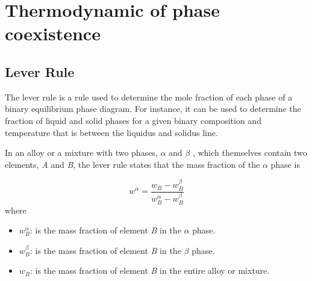 \documentclass[../main/main.tex]{subfiles}
\begin{document}
\section{Thermodynamic of phase coexistence}

\subsection{Lever Rule}


The lever rule \cite{3_lesson_1} is a rule used to determine the mole fraction of each phase of a binary equilibrium phase diagram. For instance, it can be used to determine the fraction of liquid and solid phases for a given binary composition and temperature that is between the liquidus and solidus line.

In an alloy or a mixture with two phases, \( \alpha  \)  and \( \beta  \) , which themselves contain two elements, \emph{A}  and \emph{B}, the lever rule states that the mass fraction of the \( \alpha  \)  phase is

\begin{equation}
w^{\alpha } = \frac{w_B - w_B^\beta }{w_B^\alpha - w_B^\beta }
\end{equation}
where
\begin{itemize}
\item \( w_B^\alpha  \):  is the mass fraction of element \emph{B}  in the \( \alpha  \) phase.
\item \( w_B^\beta   \):  is the mass fraction of element \emph{B} in the \( \beta  \)  phase.
\item \( w_B  \):  is the mass fraction of element \emph{B} in the entire alloy or mixture.
\end{itemize}
\end{document}
